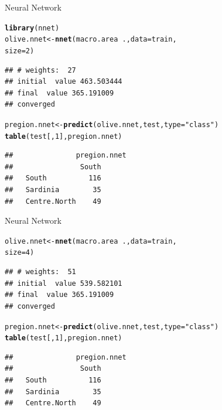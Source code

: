 \documentclass[10pt,xcolor=dvipsnames]{beamer}\usepackage[]{graphicx}\usepackage[]{color}
\makeatletter
\newcommand{\hlnum}[1]{\textcolor[rgb]{0.686,0.059,0.569}{#1}}%
\newcommand{\hlstr}[1]{\textcolor[rgb]{0.192,0.494,0.8}{#1}}%
\newcommand{\hlopt}[1]{\textcolor[rgb]{0,0,0}{#1}}%
\newcommand{\hlstd}[1]{\textcolor[rgb]{0.345,0.345,0.345}{#1}}%
\newcommand{\hlkwb}[1]{\textcolor[rgb]{0.69,0.353,0.396}{#1}}%
\newcommand{\hlkwc}[1]{\textcolor[rgb]{0.333,0.667,0.333}{#1}}%
\newcommand{\hlkwd}[1]{\textcolor[rgb]{0.737,0.353,0.396}{\textbf{#1}}}%
\newenvironment{kframe}{%
 \def\at@end@of@kframe{}%
 \ifinner\ifhmode%
  \def\at@end@of@kframe{\end{minipage}}%
  \begin{minipage}{\columnwidth}%
 \fi\fi%
 \def\FrameCommand##1{\hskip\@totalleftmargin \hskip-\fboxsep
 \colorbox{shadecolor}{##1}\hskip-\fboxsep
     \hskip-\linewidth \hskip-\@totalleftmargin \hskip\columnwidth}%
 \MakeFramed {\advance\hsize-\width
   \@totalleftmargin\z@ \linewidth\hsize
   \@setminipage}}%
 {\par\unskip\endMakeFramed%
 \at@end@of@kframe}
\newenvironment{knitrout}{}{} %
\makeatother
\begin{document}
\begin{frame}[fragile]{Neural Network}
\begin{knitrout}\footnotesize
{}\color{fgcolor}\begin{kframe}
\begin{alltt}
\hlkwd{library}\hlstd{(nnet)}
\hlstd{olive.nnet} \hlkwb{<-}  \hlkwd{nnet}\hlstd{(macro.area} \hlopt{~}\hlstd{. ,} \hlkwc{data} \hlstd{= train,}
               \hlkwc{size}\hlstd{=}\hlnum{2}\hlstd{)}
\end{alltt}
\begin{verbatim}
## # weights:  27
## initial  value 463.503444 
## final  value 365.191009 
## converged
\end{verbatim}
\begin{alltt}
\hlstd{pregion.nnet} \hlkwb{<-} \hlkwd{predict}\hlstd{(olive.nnet, test,} \hlkwc{type}\hlstd{=}\hlstr{"class"}\hlstd{)}
\hlkwd{table}\hlstd{(test[,}\hlnum{1}\hlstd{], pregion.nnet)}
\end{alltt}
\begin{verbatim}
##               pregion.nnet
##                South
##   South          116
##   Sardinia        35
##   Centre.North    49
\end{verbatim}
\end{kframe}
\end{knitrout}
\end{frame}

\begin{frame}[fragile]{Neural Network}
\begin{knitrout}\footnotesize
{}\color{fgcolor}\begin{kframe}
\begin{alltt}
\hlstd{olive.nnet} \hlkwb{<-}  \hlkwd{nnet}\hlstd{(macro.area} \hlopt{~}\hlstd{. ,} \hlkwc{data} \hlstd{= train,}
               \hlkwc{size}\hlstd{=}\hlnum{4}\hlstd{)}
\end{alltt}
\begin{verbatim}
## # weights:  51
## initial  value 539.582101 
## final  value 365.191009 
## converged
\end{verbatim}
\begin{alltt}
\hlstd{pregion.nnet} \hlkwb{<-} \hlkwd{predict}\hlstd{(olive.nnet, test,} \hlkwc{type}\hlstd{=}\hlstr{"class"}\hlstd{)}
\hlkwd{table}\hlstd{(test[,}\hlnum{1}\hlstd{], pregion.nnet)}
\end{alltt}
\begin{verbatim}
##               pregion.nnet
##                South
##   South          116
##   Sardinia        35
##   Centre.North    49
\end{verbatim}
\end{kframe}
\end{knitrout}
\end{frame}
\end{document}
